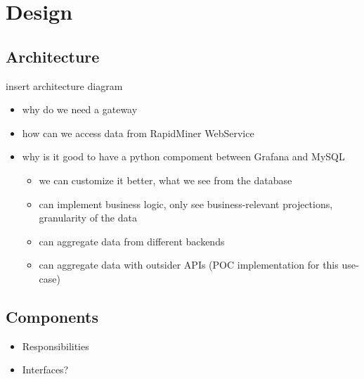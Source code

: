 \chapter{Design}

\section{Architecture}

insert architecture diagram

\begin{itemize}
	\item why do we need a gateway
	\item how can we access data from RapidMiner WebService
	\item why is it good to have a python compoment between Grafana and MySQL
	\begin{itemize}
		\item we can customize it better, what we see from the database
		\item can implement business logic, only see business-relevant projections, granularity of the data
		\item can aggregate data from different backends
		\item can aggregate data with outsider APIs (POC implementation for this use-case)
	\end{itemize}
\end{itemize}

\section{Components}

\begin{itemize}
	\item Responsibilities
	\item Interfaces?
\end{itemize}


